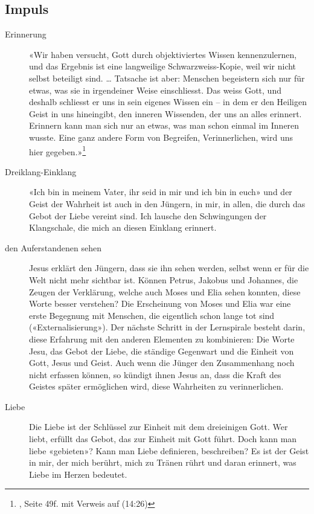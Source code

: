 \subsection{Impuls}
\begin{impuls}
\begin{description}
\item[Erinnerung]«Wir haben versucht, Gott durch objektiviertes Wissen kennenzulernen, und das Ergebnis ist eine langweilige Schwarzweiss-Kopie, weil wir nicht selbst beteiligt sind. … Tatsache ist aber: Menschen begeistern sich nur für etwas, was sie in irgendeiner Weise einschliesst. Das weiss Gott, und deshalb schliesst er uns in sein eigenes Wissen ein – in dem er den Heiligen Geist in uns hineingibt, den inneren Wissenden, der uns an alles erinnert. Erinnern kann man sich nur an etwas, was man schon einmal im Inneren wusste. Eine ganz andere Form von Begreifen, Verinnerlichen, wird uns hier gegeben.»\footnote{\cite{Tanz}, Seite 49f. mit Verweis auf 
(14:26)}
\item[Dreiklang-Einklang] «Ich bin in meinem Vater, ihr seid in mir und ich bin in euch» und der Geist der Wahrheit ist auch in den Jüngern, in mir, in allen, die durch das Gebot der Liebe vereint sind. Ich lausche den Schwingungen der Klangschale, die mich an diesen Einklang erinnert.
\item[den Auferstandenen sehen] Jesus erklärt den Jüngern, dass sie ihn sehen werden, selbst wenn er für die Welt nicht mehr sichtbar ist. Können Petrus, Jakobus und Johannes, die Zeugen der Verklärung, welche auch Moses und Elia sehen konnten, diese Worte besser verstehen? Die Erscheinung von Moses und Elia war eine erste Begegnung mit Menschen, die eigentlich schon lange tot sind («Externalisierung»). Der nächste Schritt in der Lernspirale besteht darin, diese Erfahrung mit den anderen Elementen zu kombinieren: Die Worte Jesu, das Gebot der Liebe, die ständige Gegenwart und die Einheit von Gott, Jesus und Geist. Auch wenn die Jünger den Zusammenhang noch nicht erfassen können, so kündigt ihnen Jesus an, dass die Kraft des Geistes später ermöglichen wird, diese Wahrheiten zu verinnerlichen.
\item[Liebe] Die Liebe ist der Schlüssel zur Einheit mit dem dreieinigen Gott. Wer liebt, erfüllt das Gebot, das zur Einheit mit Gott führt. Doch kann man liebe «gebieten»? Kann man Liebe definieren, beschreiben? Es ist der Geist in mir, der mich berührt, mich zu Tränen rührt und daran erinnert, was Liebe im Herzen bedeutet.
\end{description}
\end{impuls}

